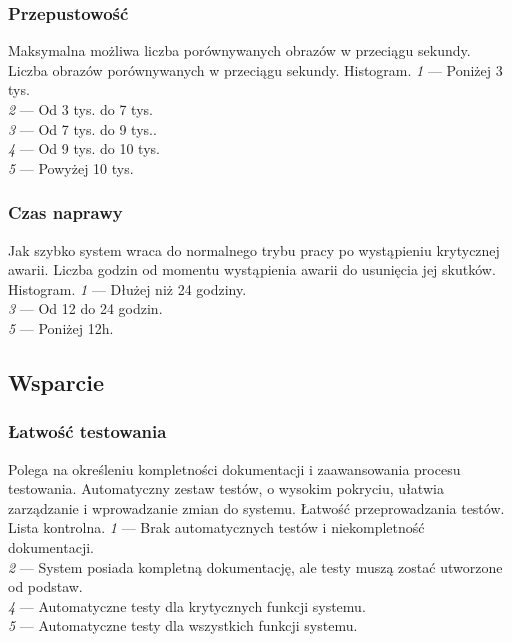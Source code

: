 \documentclass[10pt]{dokument-ppi}
\begin{document}
\subsubsection{Przepustowość}
\begin{requirement}
    \desc%
        Maksymalna możliwa liczba porównywanych obrazów w przeciągu sekundy.
    \metric%
        Liczba obrazów porównywanych w przeciągu sekundy.
    \tool%
        Histogram.
    \scale%
        \emph{1} --- Poniżej 3 tys.\\
        \emph{2} --- Od 3 tys. do 7 tys.\\
        \emph{3} --- Od 7 tys. do 9 tys..\\
        \emph{4} --- Od 9 tys. do 10 tys.\\
        \emph{5} --- Powyżej 10 tys.
\end{requirement}

\subsubsection{Czas naprawy}
\begin{requirement}
    \desc%
        Jak szybko system wraca do normalnego trybu pracy po wystąpieniu
        krytycznej awarii.
    \metric%
        Liczba godzin od momentu wystąpienia awarii do usunięcia jej skutków.
    \tool%
        Histogram.
    \scale%
        \emph{1} --- Dłużej niż 24 godziny.\\
        \emph{3} --- Od 12 do 24 godzin.\\
        \emph{5} --- Poniżej 12h.
\end{requirement}


\subsection{Wsparcie}

\subsubsection{Łatwość testowania}
\begin{requirement}
    \desc%
        Polega na określeniu kompletności dokumentacji i zaawansowania
        procesu testowania. Automatyczny zestaw testów, o wysokim
        pokryciu, ułatwia zarządzanie i wprowadzanie zmian do systemu.
    \metric%
        Łatwość przeprowadzania testów.
    \tool%
        Lista kontrolna.
    \scale%
        \emph{1} --- Brak automatycznych testów i niekompletność dokumentacji.\\
        \emph{2} --- System posiada kompletną dokumentację, ale testy muszą zostać utworzone od podstaw.\\
        \emph{4} --- Automatyczne testy dla krytycznych funkcji systemu.\\
        \emph{5} --- Automatyczne testy dla wszystkich funkcji systemu.
\end{requirement}
\end{document}
